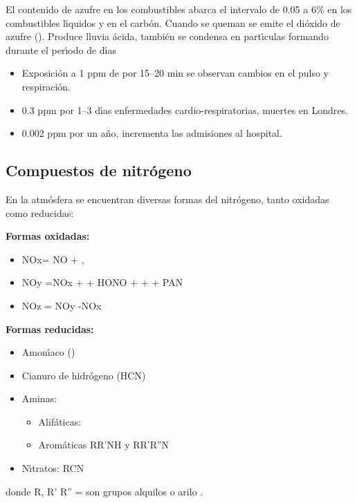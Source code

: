 El contenido de azufre en los combustibles abarca el intervalo de 0.05 a 6\% en los combustibles l\'{\i}quidos y en el carb\'on. Cuando se queman se emite el di\'oxido de azufre ().
Produce lluvia \'acida, tambi\'en se condensa en part\'{\i}culas formando  durante el per\'{\i}odo de d\'{\i}as
\begin{itemize}
\item Exposici\'on a 1 ppm de  por 15--20 min se observan cambios en el pulso y
respiraci\'on.
\item 0.3 ppm por 1--3 d\'{\i}as enfermedades cardio-respiratorias, muertes en Londres.
\item 0.002 ppm por un a\~no, incrementa las admisiones al hospital.
\end{itemize}

\subsection{Compuestos de nitr\'ogeno}
En la atm\'osfera se encuentran diversas formas del nitr\'ogeno, tanto oxidadas como reducidas:

\textbf{Formas oxidadas:}
\begin{itemize}
\item NOx= NO + ,
\item NOy =NOx +  + HONO +  +  + PAN
\item NOz = NOy -NOx
\end{itemize}

\textbf{Formas reducidas:}
\begin{itemize}
\item  Amon\'{\i}aco ()
\item Cianuro de hidr\'ogeno (HCN) 
\item Aminas:
\begin{itemize}
\item Alif\'aticas:  
\item Arom\'aticas  RR'NH y RR'R''N 
\end{itemize}
\item N\'{\i}tratos: RCN
\end{itemize}
 donde R, R' R'' = son grupos alquilos  o \gls{arilo} .

